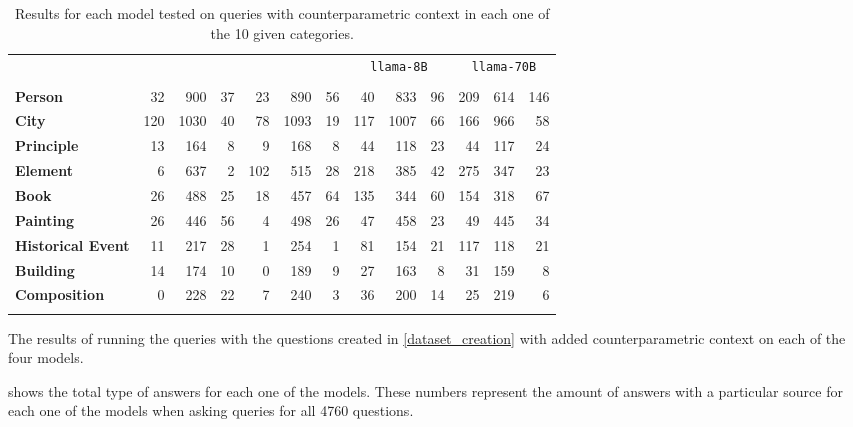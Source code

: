 \begin{table*}[t]
	\centering
	\footnotesize
	\begin{tabular}{>{\bfseries}l | r r r | r r r | r r r | r r r}
		\toprule
			& \multicolumn{3}{c|}{\smallflan{}} & \multicolumn{3}{c|}{\bigflan{}} & \multicolumn{3}{c|}{\texttt{llama-8B}} & \multicolumn{3}{c}{\texttt{llama-70B}}  \\
			& \Pc{} & \Cc{} & \Oc{} & \Pc{} & \Cc{} & \Oc{} & \Pc{} & \Cc{} & \Oc{} & \Pc{} & \Cc{} & \Oc{}  \\
		\midrule
			Person           &  32 &  900 & 37 &  23 &  890 & 56 &  40 &  833 & 96 & 209 & 614 & 146 \\
			City             & 120 & 1030 & 40 &  78 & 1093 & 19 & 117 & 1007 & 66 & 166 & 966 &  58 \\
			Principle        &  13 &  164 &  8 &   9 &  168 &  8 &  44 &  118 & 23 &  44 & 117 &  24 \\
			Element          &   6 &  637 &  2 & 102 &  515 & 28 & 218 &  385 & 42 & 275 & 347 &  23 \\
			Book             &  26 &  488 & 25 &  18 &  457 & 64 & 135 &  344 & 60 & 154 & 318 &  67 \\
			Painting         &  26 &  446 & 56 &   4 &  498 & 26 &  47 &  458 & 23 &  49 & 445 &  34 \\
			Historical Event &  11 &  217 & 28 &   1 &  254 &  1 &  81 &  154 & 21 & 117 & 118 &  21 \\
			Building         &  14 &  174 & 10 &   0 &  189 &  9 &  27 &  163 &  8 &  31 & 159 &   8 \\
			Composition      &   0 &  228 & 22 &   7 &  240 &  3 &  36 &  200 & 14 &  25 & 219 &   6 \\
		\bottomrule \addlinespace[4pt]
	\end{tabular}
	\caption{Results for each model tested on queries with counterparametric context in each one of the 10 given categories.}
	\label{cats_table}
\end{table*}

The results of running the queries with the questions created in \cref{dataset_creation} with added counterparametric context on each of the four models.

 shows the total type of answers for each one of the models.
These numbers represent the amount of answers with a particular source for each one of the models when asking queries for all 4760 questions.


